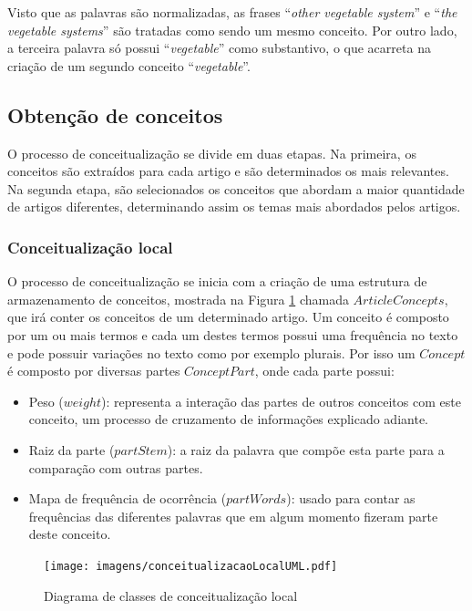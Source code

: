 \begin{enumerate}
Visto que as palavras são normalizadas, as frases “\emph{other vegetable system}” e “\emph{the vegetable systems}” são tratadas como sendo um mesmo conceito. Por outro lado, a terceira palavra só possui “\emph{vegetable}” como substantivo, o que acarreta na criação de um segundo conceito “\emph{vegetable}”.
\end{enumerate}



\subsection{Obtenção de conceitos}
O processo de conceitualização se divide em duas etapas. Na primeira, os conceitos são extraídos para cada artigo e são determinados os mais relevantes. Na segunda etapa, são selecionados os conceitos que abordam a maior quantidade de artigos diferentes, determinando assim os temas mais abordados pelos artigos.

\subsubsection{Conceitualização local}
O processo de conceitualização se inicia com a criação de uma estrutura de armazenamento de conceitos, mostrada na Figura \ref{fig:conceitualizacaoLocalUML} chamada $ArticleConcepts$, que irá conter os conceitos de um determinado artigo. Um conceito é composto por um ou mais termos e cada um destes termos possui uma frequência no texto e pode possuir variações no texto como por exemplo plurais. Por isso um $Concept$ é composto por diversas partes $ConceptPart$, onde cada parte possui:
\begin{itemize}
    \item Peso ($weight$): representa a interação das partes de outros conceitos com este conceito, um processo de cruzamento de informações explicado adiante.
    \item Raiz da parte ($partStem$): a raiz da palavra que compõe esta parte para a comparação com outras partes.
    \item Mapa de frequência de ocorrência ($partWords$): usado para contar as frequências das diferentes palavras que em algum momento fizeram parte deste conceito.
\end{itemize}

\begin{figure}[h!]
    \center
    \texttt{[image: imagens/conceitualizacaoLocalUML.pdf]}
    \caption{Diagrama de classes de conceitualização local \label{fig:conceitualizacaoLocalUML}}
\end{figure}

